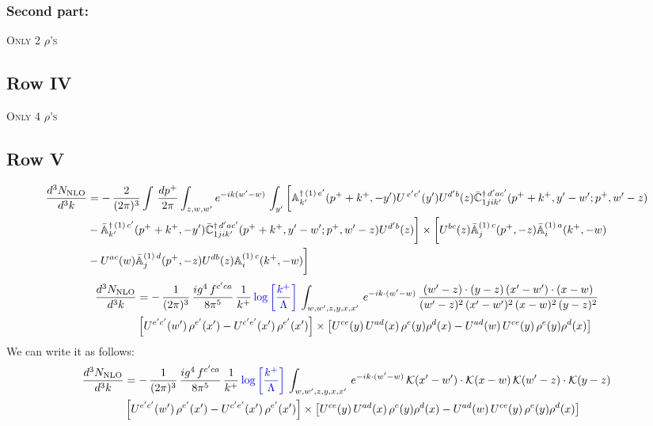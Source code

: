 \documentclass[9pt]{article}
\def\mf#1{\mathbb{#1}}
\numberwithin{equation}{section}
\begin{document}
\subsubsection{Second part:}
\textsc{Only 2 $\rho$'s}
\subsection{Row IV}
\textsc{Only 4 $\rho$'s}
\subsection{Row V}
\begin{align}
 \frac{d^{3}N_{\rm NLO}}{d^{3}k} & =   -\,\frac{2}{(2\pi)^{3}} \int\, \frac{dp^{+}}{2\pi}\int_{z,w,w^{\prime}} e^{-ik(w^{\prime}-w)}\,\int_{y^{\prime}}\bigg[\mf{A}^{\dagger\, (1)\,e^{\prime}}_{k^{\prime}}(p^{+}+k^{+},-y^{\prime})U^{\, e^{\prime}c^{\prime}}(y^{\prime})U^{d^{\prime}b}(z) \Bar{\mf{C}}^{\dagger\, d^{\prime}ac^{\prime}}_{1jik^{\prime}}(p^{+}+k^{+},y^{\prime}-w^{\prime}; p^{+},w^{\prime}-z) \notag \\ & -\Bar{\mf{A}}^{\dagger\, (1)\,c^{\prime}}_{k^{\prime}}(p^{+}+k^{+},-y^{\prime}) \Bar{\mf{C}}^{\dagger\, d^{\prime}ac^{\prime}}_{1jik^{\prime}}(p^{+}+k^{+},y^{\prime}-w^{\prime}; p^{+},w^{\prime}-z)U^{d^{\prime}b}(z)\bigg] \times  \bigg[U^{bc}(z)\Bar{\mf{A}}^{(1)\, c}_{j}(p^{+},-z)\Bar{\mf{A}}^{(1)\, a}_{i}(k^{+},-w)\notag \\ & -U^{ac}(w) \Bar{\mf{A}}^{(1)\, d}_{j}(p^{+},-z)U^{db}(z) \mf{A}^{(1)\, c}_{i}(k^{+},- w)\bigg]\nonumber
\end{align}
\begin{align}
 \frac{d^{3}N_{\rm NLO}}{d^{3}k} & =    -\,\frac{1}{(2\pi)^{3}}\, \frac{ig^{4}\,f^{c'ca}}{8\pi^{5}}\, \frac{1}{k^{+}}\,{\color{blue}\log{\left[\frac{k^{+}}{\Lambda}\right]}}\, \int_{w,w',z,y,x,x'}\, e^{-ik\cdot (w'-w)}\,\frac{(w'-z)\cdot (y-z)\,(x'-w')\cdot (x-w)}{(w'-z)^{2}\,(x'-w')^{2}\,(x-w)^{2}\,(y-z)^{2}}\notag \\ & \left[U^{e'c'}(w')\,\rho^{e'}(x')-U^{c'e'}(x')\,\rho^{e'}(x')\right]\times  \left[U^{ce}(y)\,U^{ad}(x)\,\rho^{e}(y)\rho^{d}(x)-U^{ad}(w)\,U^{ce}(y)\,\rho^{e}(y)\rho^{d}(x)\right]
\end{align}
We can write it as follows: 
\begin{align}
 \frac{d^{3}N_{\rm NLO}}{d^{3}k} & =    -\,\frac{1}{(2\pi)^{3}}\, \frac{ig^{4}\,f^{c'ca}}{8\pi^{5}}\, \frac{1}{k^{+}}\,{\color{blue}\log{\left[\frac{k^{+}}{\Lambda}\right]}}\, \int_{w,w',z,y,x,x'}\, e^{-ik\cdot (w'-w)}\,\mathcal{K}(x'-w')\cdot \mathcal{K}(x-w)\,\mathcal{K}(w'-z)\cdot \mathcal{K}(y-z)\notag \\ & \left[U^{e'c'}(w')\,\rho^{e'}(x')-U^{c'e'}(x')\,\rho^{e'}(x')\right]\times  \left[U^{ce}(y)\,U^{ad}(x)\,\rho^{e}(y)\rho^{d}(x)-U^{ad}(w)\,U^{ce}(y)\,\rho^{e}(y)\rho^{d}(x)\right]
\end{align}
\end{document}
